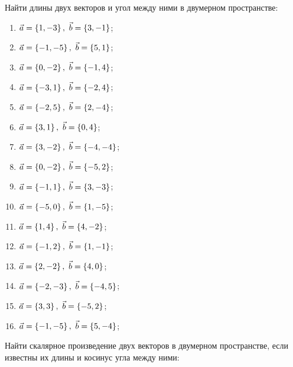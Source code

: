 	\vspace{15pt}
	Найти длины двух векторов и угол между ними в двумерном пространстве:

	\begin{multicols}{2}
		\begin{enumerate}
			\setcounter{enumi}{\value{tasks}}

				\item \( \displaystyle \vec{a} = \left\lbrace 1, -3 \right\rbrace, ~ \vec{b} = \left\lbrace 3, -1 \right\rbrace \);
				\item \( \displaystyle \vec{a} = \left\lbrace -1, -5 \right\rbrace, ~ \vec{b} = \left\lbrace 5, 1 \right\rbrace \);
				\item \( \displaystyle \vec{a} = \left\lbrace 0, -2 \right\rbrace, ~ \vec{b} = \left\lbrace -1, 4 \right\rbrace \);
				\item \( \displaystyle \vec{a} = \left\lbrace -3, 1 \right\rbrace, ~ \vec{b} = \left\lbrace -2, 4 \right\rbrace \);
				\item \( \displaystyle \vec{a} = \left\lbrace -2, 5 \right\rbrace, ~ \vec{b} = \left\lbrace 2, -4 \right\rbrace \);
				\item \( \displaystyle \vec{a} = \left\lbrace 3, 1 \right\rbrace, ~ \vec{b} = \left\lbrace 0, 4 \right\rbrace \);
				\item \( \displaystyle \vec{a} = \left\lbrace 3, -2 \right\rbrace, ~ \vec{b} = \left\lbrace -4, -4 \right\rbrace \);
				\item \( \displaystyle \vec{a} = \left\lbrace 0, -2 \right\rbrace, ~ \vec{b} = \left\lbrace -5, 2 \right\rbrace \);
				\item \( \displaystyle \vec{a} = \left\lbrace -1, 1 \right\rbrace, ~ \vec{b} = \left\lbrace 3, -3 \right\rbrace \);
				\item \( \displaystyle \vec{a} = \left\lbrace -5, 0 \right\rbrace, ~ \vec{b} = \left\lbrace 1, -5 \right\rbrace \);
				\item \( \displaystyle \vec{a} = \left\lbrace 1, 4 \right\rbrace, ~ \vec{b} = \left\lbrace 4, -2 \right\rbrace \);
				\item \( \displaystyle \vec{a} = \left\lbrace -1, 2 \right\rbrace, ~ \vec{b} = \left\lbrace 1, -1 \right\rbrace \);
				\item \( \displaystyle \vec{a} = \left\lbrace 2, -2 \right\rbrace, ~ \vec{b} = \left\lbrace 4, 0 \right\rbrace \);
				\item \( \displaystyle \vec{a} = \left\lbrace -2, -3 \right\rbrace, ~ \vec{b} = \left\lbrace -4, 5 \right\rbrace \);
				\item \( \displaystyle \vec{a} = \left\lbrace 3, 3 \right\rbrace, ~ \vec{b} = \left\lbrace -5, 2 \right\rbrace \);
				\item \( \displaystyle \vec{a} = \left\lbrace -1, -5 \right\rbrace, ~ \vec{b} = \left\lbrace 5, -4 \right\rbrace \);

			\setcounter{tasks}{\value{enumi}}
		\end{enumerate}
	\end{multicols}

	\vspace{15pt}
	Найти скалярное произведение двух векторов в двумерном пространстве, если известны их длины и косинус угла между ними:
	
